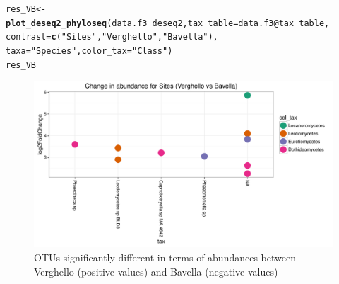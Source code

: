 \documentclass[12pt]{article}\usepackage[]{graphicx}\usepackage[]{color}
\makeatletter
\def\maxwidth{ %
  \ifdim\Gin@nat@width>\linewidth
    \linewidth
  \else
    \Gin@nat@width
  \fi
}
\newcommand{\hlstr}[1]{\textcolor[rgb]{0.192,0.494,0.8}{#1}}%
\newcommand{\hlopt}[1]{\textcolor[rgb]{0,0,0}{#1}}%
\newcommand{\hlstd}[1]{\textcolor[rgb]{0.345,0.345,0.345}{#1}}%
\newcommand{\hlkwb}[1]{\textcolor[rgb]{0.69,0.353,0.396}{#1}}%
\newcommand{\hlkwc}[1]{\textcolor[rgb]{0.333,0.667,0.333}{#1}}%
\newcommand{\hlkwd}[1]{\textcolor[rgb]{0.737,0.353,0.396}{\textbf{#1}}}%
\newenvironment{kframe}{%
 \def\at@end@of@kframe{}%
 \ifinner\ifhmode%
  \def\at@end@of@kframe{\end{minipage}}%
  \begin{minipage}{\columnwidth}%
 \fi\fi%
 \def\FrameCommand##1{\hskip\@totalleftmargin \hskip-\fboxsep
 \colorbox{shadecolor}{##1}\hskip-\fboxsep
     \hskip-\linewidth \hskip-\@totalleftmargin \hskip\columnwidth}%
 \MakeFramed {\advance\hsize-\width
   \@totalleftmargin\z@ \linewidth\hsize
   \@setminipage}}%
 {\par\unskip\endMakeFramed%
 \at@end@of@kframe}
\newenvironment{knitrout}{}{} %
\numberwithin{figure}{section}
\makeatother
\begin{document}
\begin{knitrout}\small
{}\color{fgcolor}\begin{kframe}
\begin{alltt}
\hlstd{res_VB} \hlkwb{<-} \hlkwd{plot_deseq2_phyloseq}\hlstd{(data.f3_deseq2,} \hlkwc{tax_table} \hlstd{= data.f3}\hlopt{@}\hlkwc{tax_table}\hlstd{,}
                               \hlkwc{contrast} \hlstd{=} \hlkwd{c}\hlstd{(}\hlstr{"Sites"}\hlstd{,} \hlstr{"Verghello"}\hlstd{,} \hlstr{"Bavella"}\hlstd{),}
                               \hlkwc{taxa} \hlstd{=} \hlstr{"Species"}\hlstd{,} \hlkwc{color_tax} \hlstd{=} \hlstr{"Class"}\hlstd{)}
\hlstd{res_VB}
\end{alltt}
\end{kframe}\begin{figure}

{\centering \includegraphics[width=\maxwidth]{figure/unnamed-chunk-70-1} 

}

\caption[OTUs significantly different in terms of abundances between Verghello (positive values) and Bavella (negative values)]{OTUs significantly different in terms of abundances between Verghello (positive values) and Bavella (negative values)}\label{fig:unnamed-chunk-70}
\end{figure}


\end{knitrout}
\end{document}
